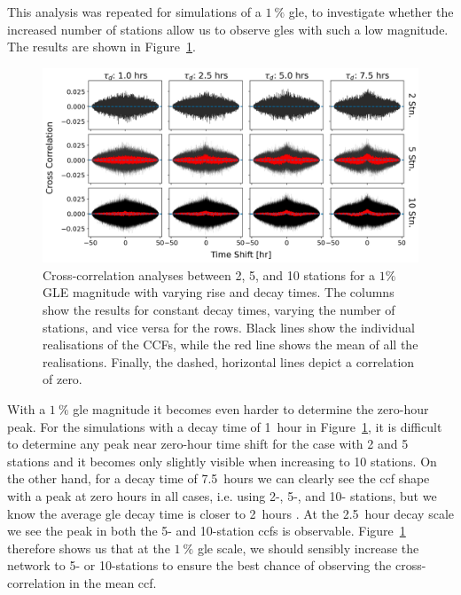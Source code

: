 This analysis was repeated for simulations of a $1~\%$ \gls{gle}, to investigate whether the increased number of stations allow us to observe \glspl{gle} with such a low magnitude. The results are shown in Figure~\ref{fig:HS_14008_1pc_sim_CCFs}.


\begin{figure}[ht!]
	\centering
	\includegraphics[width=\columnwidth]{HS_14008_sims_CCF_1pc_plot.png}
	\caption{Cross-correlation analyses between 2, 5, and 10 stations for a $1 \%$ GLE magnitude with varying rise and decay times. The columns show the results for constant decay times, varying the number of stations, and vice versa for the rows. Black lines show the individual realisations of the CCFs, while the red line shows the mean of all the realisations. Finally, the dashed, horizontal lines depict a correlation of zero.}
	\label{fig:HS_14008_1pc_sim_CCFs}
\end{figure}


With a $1~\%$ \gls{gle} magnitude it becomes even harder to determine the zero-hour peak. For the simulations with a decay time of 1~hour in Figure~\ref{fig:HS_14008_1pc_sim_CCFs}, it is difficult to determine any peak near zero-hour time shift for the case with 2 and 5 stations and it becomes only slightly visible when increasing to 10 stations. On the other hand, for a decay time of 7.5~hours we can clearly see the \gls{ccf} shape with a peak at zero hours in all cases, i.e. using 2-, 5-, and 10- stations, but we know the average \gls{gle} decay time is closer to 2~hours \citep{strauss_pulse_2017}. At the 2.5~hour decay scale we see the peak in both the 5- and 10-station \glspl{ccf} is observable. Figure~\ref{fig:HS_14008_1pc_sim_CCFs} therefore shows us that at the $1~\%$ \gls{gle} scale, we should sensibly increase the network to 5- or 10-stations to ensure the best chance of observing the cross-correlation in the mean \gls{ccf}.

